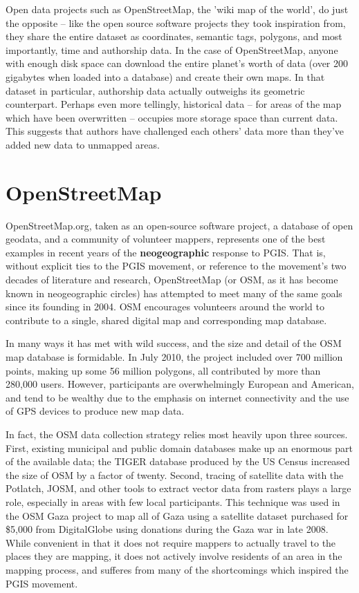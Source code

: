 \documentclass[11pt]{report}
\begin{document}
Open data projects such as OpenStreetMap, the 'wiki map of the world', do just the opposite – like the open source software projects they took inspiration from, they share the entire dataset as coordinates, semantic tags, polygons, and most importantly, time and authorship data. In the case of OpenStreetMap, anyone with enough disk space can download the entire planet's worth of data (over 200 gigabytes when loaded into a database) and create their own maps. In that dataset in particular, authorship data actually outweighs its geometric counterpart. Perhaps even more tellingly, historical data – for areas of the map which have been overwritten – occupies more storage space than current data. This suggests that authors have challenged each others' data more than they've added new data to unmapped areas. \cite{warren2009composition}

\section{OpenStreetMap}
\label{sec:openstreetmap}

OpenStreetMap.org, taken as an open-source software project, a database of open geodata, and a community of volunteer mappers, represents one of the best examples in recent years of the \textbf{neogeographic} response to PGIS. That is, without explicit ties to the PGIS movement, or reference to the movement's two decades of literature and research, OpenStreetMap (or OSM, as it has become known in neogeographic circles) has attempted to meet many of the same goals since its founding in 2004. OSM encourages volunteers around the world to contribute to a single, shared digital map and corresponding map database.\cite{chilton-crowdsourcing} 

In many ways it has met with wild success, and the size and detail of the OSM map database is formidable. In July 2010, the project included over 700 million points, making up some 56 million polygons, all contributed by more than 280,000 users.\cite{osm2010stats} However, participants are overwhelmingly European and American, and tend to be wealthy due to the emphasis on internet connectivity and the use of GPS devices to produce new map data.

In fact, the OSM data collection strategy relies most heavily upon three sources. First, existing municipal and public domain databases make up an enormous part of the available data; the TIGER database produced by the US Census increased the size of OSM by a factor of twenty.\cite{willis2007osm} Second, tracing of satellite data with the Potlatch, JOSM, and other tools to extract vector data from rasters plays a large role, especially in areas with few local participants. This technique was used in the OSM Gaza project to map all of Gaza using a satellite dataset purchased for \$5,000 from DigitalGlobe using donations during the Gaza war in late 2008. \cite{maron2010openstreetmap}\cite{chilton-crowdsourcing} While convenient in that it does not require mappers to actually travel to the places they are mapping, it does not actively involve residents of an area in the mapping process, and sufferes from many of the shortcomings which inspired the PGIS movement. 
\end{document}
